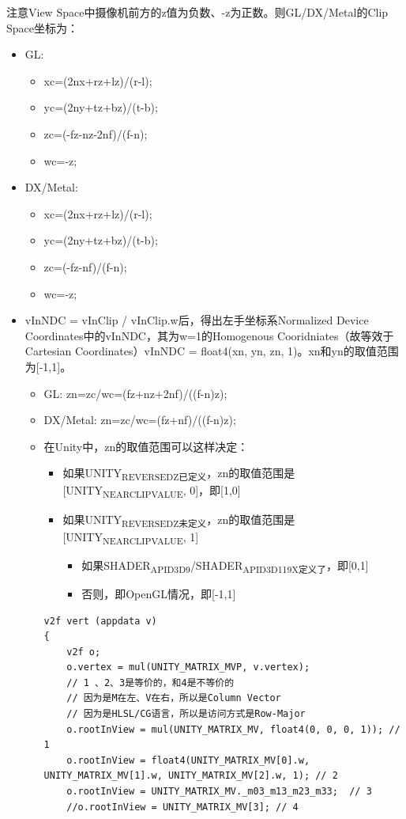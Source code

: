 \documentclass[9pt, b5paper]{article}
\begin{document}
注意View Space中摄像机前方的z值为负数、-z为正数。则GL/DX/Metal的Clip Space坐标为：
\begin{itemize}
\item GL:
\begin{itemize}
\item xc=(2nx+rz+lz)/(r-l);
\item yc=(2ny+tz+bz)/(t-b);
\item zc=(-fz-nz-2nf)/(f-n);
\item wc=-z;
\end{itemize}
\item DX/Metal:
\begin{itemize}
\item xc=(2nx+rz+lz)/(r-l);
\item yc=(2ny+tz+bz)/(t-b);
\item zc=(-fz-nf)/(f-n);
\item wc=-z;
\end{itemize}
\item vInNDC = vInClip / vInClip.w后，得出左手坐标系Normalized Device Coordinates中的vInNDC，其为w=1的Homogenous Cooridniates（故等效于Cartesian Coordinates）vInNDC = float4(xn, yn, zn, 1)。xn和yn的取值范围为[-1,1]。
\begin{itemize}
\item GL: zn=zc/wc=(fz+nz+2nf)/((f-n)z);
\item DX/Metal: zn=zc/wc=(fz+nf)/((f-n)z);
\item 在Unity中，zn的取值范围可以这样决定：
\begin{itemize}
\item 如果UNITY\textsubscript{REVERSED}\textsubscript{Z已定义}，zn的取值范围是[UNITY\textsubscript{NEAR}\textsubscript{CLIP}\textsubscript{VALUE}, 0]，即[1,0]
\item 如果UNITY\textsubscript{REVERSED}\textsubscript{Z未定义}，zn的取值范围是[UNITY\textsubscript{NEAR}\textsubscript{CLIP}\textsubscript{VALUE}, 1]
\begin{itemize}
\item 如果SHADER\textsubscript{API}\textsubscript{D3D9}/SHADER\textsubscript{API}\textsubscript{D3D11}\textsubscript{9X定义了}，即[0,1]
\item 否则，即OpenGL情况，即[-1,1]
\end{itemize}
\end{itemize}

\begin{verbatim}
v2f vert (appdata v)
{
    v2f o;
    o.vertex = mul(UNITY_MATRIX_MVP, v.vertex);
    // 1 、2、3是等价的，和4是不等价的
    // 因为是M在左、V在右，所以是Column Vector
    // 因为是HLSL/CG语言，所以是访问方式是Row-Major
    o.rootInView = mul(UNITY_MATRIX_MV, float4(0, 0, 0, 1)); // 1
    o.rootInView = float4(UNITY_MATRIX_MV[0].w, UNITY_MATRIX_MV[1].w, UNITY_MATRIX_MV[2].w, 1); // 2                
    o.rootInView = UNITY_MATRIX_MV._m03_m13_m23_m33;  // 3
    //o.rootInView = UNITY_MATRIX_MV[3]; // 4


\end{verbatim}
\end{itemize}
\end{itemize}
\end{document}
